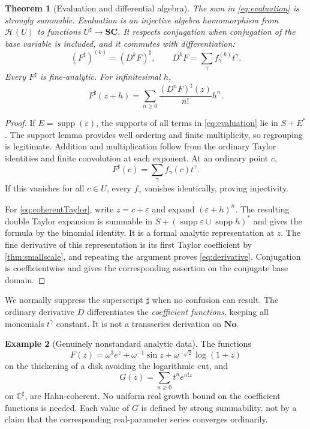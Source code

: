 \documentclass[11pt,letterpaper]{article}
\newtheorem{theorem}{Theorem}[section]
\theoremstyle{definition}
\newtheorem{example}[theorem]{Example}
\theoremstyle{remark}
\newcommand{\No}{\mathbf{No}}
\newcommand{\SC}{\mathbf{SC}}
\newcommand{\C}{\mathbb C}
\newcommand{\HH}{\mathcal H}
\newcommand{\supp}{\operatorname{supp}}
\newcommand{\sh}{^{\sharp}}
\numberwithin{equation}{section}
\begin{document}
\begin{theorem}[Evaluation and differential algebra]\label{thm:evaluation}
The sum in \eqref{eq:evaluation} is strongly summable. Evaluation is an injective algebra homomorphism from $\HH(U)$ to functions $U\sh\to\SC$. It respects conjugation when conjugation of the base variable is included, and it commutes with differentiation:
\begin{equation}\label{eq:derivative}
 (F\sh)^{(k)}=(D^kF)\sh,\qquad
 D^kF=\sum_\gamma f_\gamma^{(k)}t^\gamma.
\end{equation}
Every $F\sh$ is fine-analytic. For infinitesimal $h$,
\begin{equation}\label{eq:coherentTaylor}
 F\sh(z+h)=\sum_{n\ge0}\frac{(D^nF)\sh(z)}{n!}h^n.
\end{equation}
\end{theorem}
\begin{proof}
If $E=\supp(\varepsilon)$, the supports of all terms in \eqref{eq:evaluation} lie in $S+E^*$. The support lemma provides well ordering and finite multiplicity, so regrouping is legitimate. Addition and multiplication follow from the ordinary Taylor identities and finite convolution at each exponent. At an ordinary point $c$,
\[
 F\sh(c)=\sum_\gamma f_\gamma(c)t^\gamma.
\]
If this vanishes for all $c\in U$, every $f_\gamma$ vanishes identically, proving injectivity.

For \eqref{eq:coherentTaylor}, write $z=c+\varepsilon$ and expand $(\varepsilon+h)^n$. The resulting double Taylor expansion is summable in $S+(\supp\varepsilon\cup\supp h)^*$ and gives the formula by the binomial identity. It is a formal analytic representation at $z$. The fine derivative of this representation is its first Taylor coefficient by \cref{thm:smallscale}, and repeating the argument proves \eqref{eq:derivative}. Conjugation is coefficientwise and gives the corresponding assertion on the conjugate base domain.
\end{proof}
We normally suppress the superscript $\sharp$ when no confusion can result. The ordinary derivative $D$ differentiates the \emph{coefficient functions}, keeping all monomials $t^\gamma$ constant. It is not a transseries derivation on $\No$.

\begin{example}[Genuinely nonstandard analytic data]
The functions
\[
 F(z)=\omega^3e^z+\omega^{-1}\sin z+\omega^{-\sqrt2}\log(1+z)
\]
on the thickening of a disk avoiding the logarithmic cut, and
\[
 G(z)=\sum_{n\ge0}t^n e^{n!z}
\]
on $\C\sh$, are Hahn-coherent. No uniform real growth bound on the coefficient functions is needed. Each value of $G$ is defined by strong summability, not by a claim that the corresponding real-parameter series converges ordinarily.
\end{example}
\end{document}
